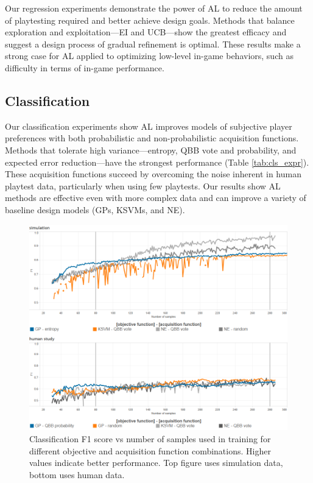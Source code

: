 \documentclass{sig-alternate}
\begin{document}
Our regression experiments demonstrate the power of AL to reduce the amount of playtesting required and better achieve design goals.
Methods that balance exploration and exploitation---EI and UCB---show the greatest efficacy and suggest a design process of gradual refinement is optimal.
These results make a strong case for AL applied to optimizing low-level in-game behaviors, such as difficulty in terms of in-game performance.


\subsection{Classification}
Our classification experiments show AL improves models of subjective player preferences with both probabilistic and non-probabilistic acquisition functions.
Methods that tolerate high variance---entropy, QBB vote and probability, and expected error reduction---have the strongest performance (Table \ref{tab:cls_expr}).
These acquisition functions succeed by overcoming the noise inherent in human playtest data, particularly when using few playtests.
Our results show AL methods are effective even with more complex data and can improve a variety of baseline design models (GPs, KSVMs, and NE).


\begin{figure}[tbph]
\centering
\includegraphics[width=\linewidth]{classification_results}
\caption{Classification F1 score vs number of samples used in training for different objective and acquisition function combinations. Higher values indicate better performance. Top figure uses simulation data, bottom uses human data.}
\label{fig:cls_all}
\end{figure}
\end{document}
